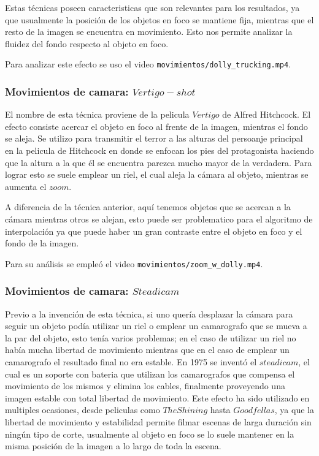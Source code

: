 Estas técnicas poseen caracteristicas que son relevantes para los resultados, ya que usualmente la posición de los objetos en foco se mantiene fija, mientras que el resto de la imagen se encuentra en movimiento. Esto nos permite analizar la fluidez del fondo respecto al objeto en foco. 

Para analizar este efecto se uso el video \texttt{movimientos/dolly\_trucking.mp4}.

\subsubsection{Movimientos de camara: $Vertigo-shot$}

El nombre de esta técnica proviene de la pelicula $Vertigo$ de Alfred Hitchcock. El efecto consiste acercar el objeto en foco al frente de la imagen, mientras el fondo se aleja. Se utilizo para transmitir el terror a las alturas del persoanje principal en la pelicula de Hitchcock en donde se enfocan los pies del protagonista haciendo que la altura a la que él se encuentra parezca mucho mayor de la verdadera. Para lograr esto se suele emplear un riel, el cual aleja la cámara al objeto, mientras se aumenta el $zoom$.

A diferencia de la técnica anterior, aquí tenemos objetos que se acercan a la cámara mientras otros se alejan, esto puede ser problematico para el algoritmo de interpolación ya que puede haber un gran contraste entre el objeto en foco y el fondo de la imagen. 

Para su análisis se empleó el video \texttt{movimientos/zoom\_w\_dolly.mp4}.

\subsubsection{Movimientos de camara: $Steadicam$}

Previo a la invención de esta técnica, si uno quería desplazar la cámara para seguir un objeto podía utilizar un riel o emplear un camarografo que se mueva a la par del objeto, esto tenía varios problemas; en el caso de utilizar un riel no había mucha libertad de movimiento mientras que en el caso de emplear un camarografo el resultado final no era estable. En 1975 se inventó el $steadicam$, el cual es un soporte con bateria que utilizan los camarografos que compensa el movimiento de los mismos y elimina los cables, finalmente proveyendo una imagen estable con total libertad de movimiento. Este efecto ha sido utilizado en multiples ocasiones, desde peliculas como $The Shining$ hasta $Goodfellas$, ya que la libertad de movimiento y estabilidad permite filmar escenas de larga duración sin ningún tipo de corte, usualmente al objeto en foco se lo suele mantener en la misma posición de la imagen a lo largo de toda la escena.

